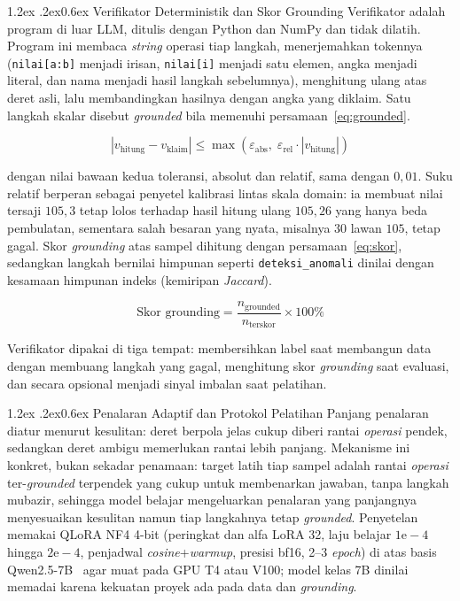 \documentclass[10pt,a4paper,twocolumn]{article}
\makeatletter
\renewcommand\subsection{\@startsection{subsection}{2}{\z@}%
  {1.2ex \@plus .2ex}{0.6ex}%
  {\normalfont\small\bfseries\itshape}}
\makeatother
\begin{document}
\subsection{Verifikator Deterministik dan Skor Grounding}
Verifikator adalah program di luar LLM, ditulis dengan Python dan NumPy dan tidak
dilatih. Program ini membaca \textit{string} operasi tiap langkah, menerjemahkan
tokennya (\texttt{nilai[a:b]} menjadi irisan, \texttt{nilai[i]} menjadi satu
elemen, angka menjadi literal, dan nama menjadi hasil langkah sebelumnya),
menghitung ulang atas deret asli, lalu membandingkan hasilnya dengan angka yang
diklaim. Satu langkah skalar disebut \textit{grounded} bila memenuhi
persamaan~\eqref{eq:grounded}.

\begin{equation}
\label{eq:grounded}
\left| v_{\text{hitung}} - v_{\text{klaim}} \right|
\le \max\!\left( \varepsilon_{\text{abs}},\;
\varepsilon_{\text{rel}} \cdot \left| v_{\text{hitung}} \right| \right)
\end{equation}

dengan nilai bawaan kedua toleransi, absolut dan relatif, sama dengan $0,01$. Suku
relatif berperan sebagai penyetel kalibrasi lintas skala domain: ia membuat nilai
tersaji $105,3$ tetap lolos terhadap hasil hitung ulang $105,26$ yang hanya beda
pembulatan, sementara salah besaran yang nyata, misalnya $30$ lawan $105$, tetap
gagal. Skor \textit{grounding} atas sampel dihitung dengan
persamaan~\eqref{eq:skor}, sedangkan langkah bernilai himpunan seperti
\texttt{deteksi\_anomali} dinilai dengan kesamaan himpunan indeks (kemiripan
\textit{Jaccard}).

\begin{equation}
\label{eq:skor}
\text{Skor grounding} = \frac{n_{\text{grounded}}}{n_{\text{terskor}}} \times 100\%
\end{equation}

Verifikator dipakai di tiga tempat: membersihkan label saat membangun data dengan
membuang langkah yang gagal, menghitung skor \textit{grounding} saat evaluasi, dan
secara opsional menjadi sinyal imbalan saat pelatihan.

\subsection{Penalaran Adaptif dan Protokol Pelatihan}
Panjang penalaran diatur menurut kesulitan: deret berpola jelas cukup diberi
rantai \textit{operasi} pendek, sedangkan deret ambigu memerlukan rantai lebih
panjang. Mekanisme ini konkret, bukan sekadar penamaan: target latih tiap sampel
adalah rantai \textit{operasi} ter-\textit{grounded} terpendek yang cukup untuk
membenarkan jawaban, tanpa langkah mubazir, sehingga model belajar mengeluarkan
penalaran yang panjangnya menyesuaikan kesulitan namun tiap langkahnya tetap
\textit{grounded}. Penyetelan memakai QLoRA NF4 4-bit (peringkat dan alfa LoRA
32, laju belajar $1\mathrm{e}{-}4$ hingga $2\mathrm{e}{-}4$, penjadwal
\textit{cosine}+\textit{warmup}, presisi bf16, 2--3 \textit{epoch}) di atas basis
Qwen2.5-7B~\cite{qlora2023,unsloth2024,qwen2024} agar muat pada GPU T4 atau V100;
model kelas 7B dinilai memadai karena kekuatan proyek ada pada data dan
\textit{grounding}.
\end{document}
